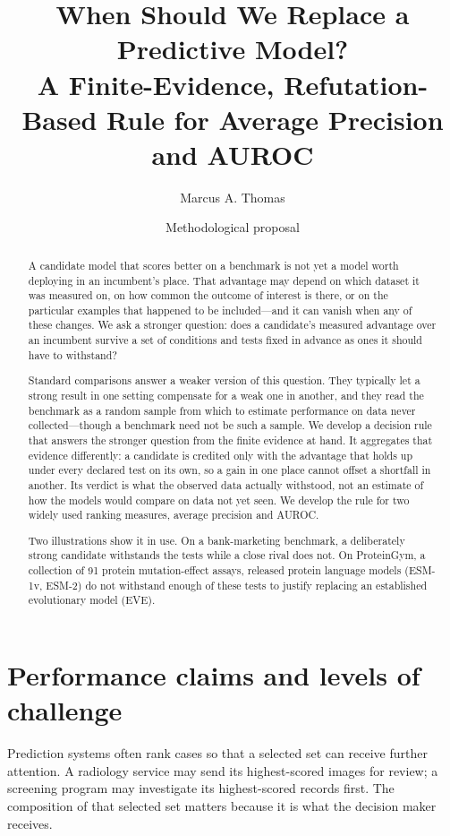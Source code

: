 \documentclass[11pt]{article}
\title{When Should We Replace a Predictive Model?\\
\large A Finite-Evidence, Refutation-Based Rule for Average Precision and AUROC}
\author{Marcus A. Thomas}
\date{Methodological proposal}
\theoremstyle{remark}
\begin{document}
\maketitle

\begin{abstract}
A candidate model that scores better on a benchmark is not yet a model worth
deploying in an incumbent's place. That advantage may depend on which dataset it
was measured on, on how common the outcome of interest is there, or on the
particular examples that happened to be included---and it can vanish when any of
these changes. We ask a stronger question: does a candidate's measured advantage
over an incumbent survive a set of conditions and tests fixed in advance as ones
it should have to withstand?

Standard comparisons answer a weaker version of this question. They typically
let a strong result in one setting compensate for a weak one in another, and
they read the benchmark as a random sample from which to estimate performance on
data never collected---though a benchmark need not be such a sample. We develop a
decision rule that answers the stronger question from the finite evidence at
hand. It aggregates that evidence differently: a candidate is credited only with
the advantage that holds up under every declared test on its own, so a gain in
one place cannot offset a shortfall in another. Its verdict is what the observed
data actually withstood, not an estimate of how the models would compare on data
not yet seen. We develop the rule for two widely used ranking measures, average
precision and AUROC.

Two illustrations show it in use. On a bank-marketing benchmark, a deliberately
strong candidate withstands the tests while a close rival does not. On
ProteinGym, a collection of 91 protein mutation-effect assays, released protein
language models (ESM-1v, ESM-2) do not withstand enough of these tests to
justify replacing an established evolutionary model (EVE).
\end{abstract}


\section{Performance claims and levels of challenge}
\label{sec:introduction}

Prediction systems often rank cases so that a selected set can receive further
attention. A radiology service may send its highest-scored images for review;
a screening program may investigate its highest-scored records first. The
composition of that selected set matters because it is what the decision maker
receives.
\end{document}
